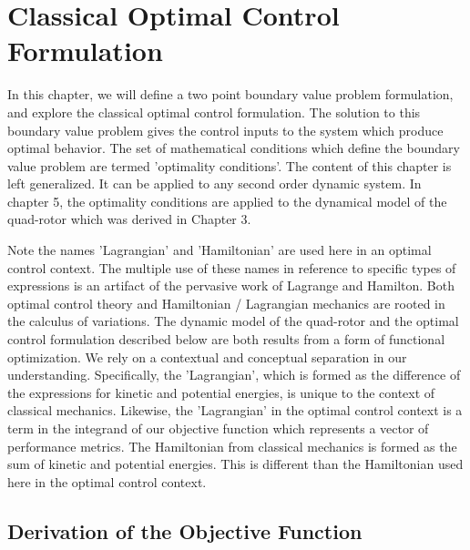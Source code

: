 
\chapter{Classical Optimal Control Formulation} %

\label{Chapter4} %


In this chapter, we will define a two point boundary value problem formulation, and explore the classical optimal control formulation. The solution to this boundary value problem gives the control inputs to the system which produce optimal behavior. The set of mathematical conditions which define the boundary value problem are termed 'optimality conditions'. The content of this chapter is left generalized. It can be applied to any second order dynamic system. In chapter 5, the optimality conditions are applied to the dynamical model of the quad-rotor which was derived in Chapter 3.

Note the names 'Lagrangian' and 'Hamiltonian' are used here in an optimal control context. The multiple use of these names in reference to specific types of expressions is an artifact of the pervasive work of Lagrange and Hamilton. Both optimal control theory and Hamiltonian / Lagrangian mechanics are rooted in the calculus of variations. The dynamic model of the quad-rotor and the optimal control formulation described below are both results from a form of functional optimization. We rely on a contextual and conceptual separation in our understanding. Specifically, the 'Lagrangian', which is formed as the difference of the expressions for kinetic and potential energies, is unique to the context of classical mechanics. Likewise, the 'Lagrangian' in the optimal control context is a term in the integrand of our objective function which represents a vector of performance metrics. The Hamiltonian from classical mechanics is formed as the sum of kinetic and potential energies. This is different than the Hamiltonian used here in the optimal control context.



\section{Derivation of the Objective Function}

